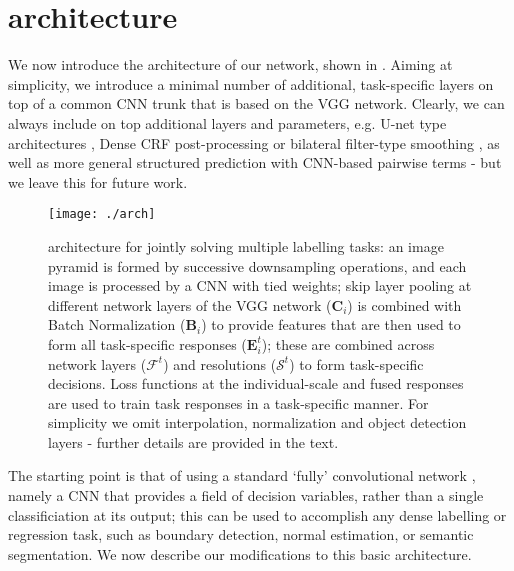 \documentclass[10pt,twocolumn,letterpaper]{article}
\begin{document}
\section{\ubernet architecture}
\label{arch}


We now introduce the  architecture of our network, shown in . Aiming at simplicity, we introduce a minimal number of additional, task-specific  layers on top of a common  CNN trunk that is based on the VGG network. Clearly, we can always include on top additional  layers and parameters, e.g.  U-net type architectures  \cite{RonnebergerFB15,NohHH15,NewellYD16,GhiasiF16}, Dense CRF post-processing \cite{krahenbuhl2011efficient,ChenPK0Y16,crfrnn} or bilateral filter-type smoothing \cite{HarleyDK15,ChenBPMY15}, as well as more general structured prediction with  CNN-based pairwise terms \cite{Adelaide,ChandraK16} - but we leave this for future work.



\begin{figure*}
	\begin{center}
		\texttt{[image: ./arch]}	
	\end{center}
	\caption{\ubernet architecture for jointly solving multiple labelling tasks: an image pyramid is formed by successive downsampling operations, and each image is processed by a CNN with tied weights; skip layer pooling at different network layers of the VGG network ($\mathbf{C}_i$) is combined with Batch Normalization ($\mathbf{B}_i$) to provide features that are then used to form all task-specific responses ($\mathbf{E}_i^t$); these  are combined across network layers ($\mathcal{F}^t$) and resolutions ($\mathcal{S}^t$) to form  task-specific decisions. Loss functions at the individual-scale and fused responses are used to train  task responses in a task-specific manner. For simplicity we omit interpolation, normalization and  object detection layers  - further details are provided in the text.   
		\label{fig:multi-task}}
\end{figure*}

 The starting point is that of using a standard  `fully' convolutional network  \cite{LeCun1998,SEZM+14,PapandreouKS15,LongSD15}, namely a CNN that provides   a field of decision variables, rather than a single classificiation at its output; this can be used to accomplish any dense labelling or regression task, such as boundary detection, normal estimation, or semantic segmentation. We now describe our modifications to this basic architecture. 
\end{document}
